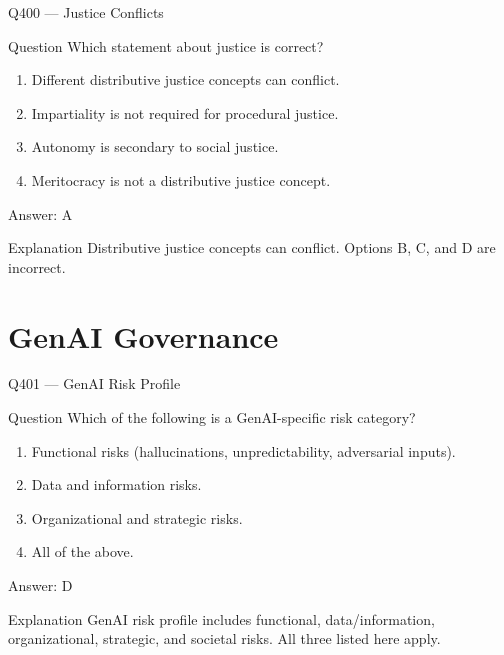 \documentclass[aspectratio=169,8pt]{beamer}
\begin{document}
	\begin{frame}{Q400 --- Justice Conflicts}
		\begin{block}{Question}
			Which statement about justice is correct?
			\begin{enumerate}
				\item Different distributive justice concepts can conflict.
				\item Impartiality is not required for procedural justice.
				\item Autonomy is secondary to social justice.
				\item Meritocracy is not a distributive justice concept.
			\end{enumerate}
		\end{block}
		\begin{exampleblock}{Answer: A}\end{exampleblock}
		\begin{block}{Explanation}
			Distributive justice concepts can conflict. Options B, C, and D are incorrect.
		\end{block}
	\end{frame}
	
	\section{GenAI Governance}
	
	\begin{frame}{Q401 --- GenAI Risk Profile}
		\begin{block}{Question}
			Which of the following is a GenAI-specific risk category?
			\begin{enumerate}
				\item Functional risks (hallucinations, unpredictability, adversarial inputs).
				\item Data and information risks.
				\item Organizational and strategic risks.
				\item All of the above.
			\end{enumerate}
		\end{block}
		\begin{exampleblock}{Answer: D}\end{exampleblock}
		\begin{block}{Explanation}
			GenAI risk profile includes functional, data/information, organizational, strategic, and societal risks. All three listed here apply.
		\end{block}
	\end{frame}
	
\end{document}
